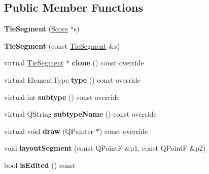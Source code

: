 \subsection*{Public Member Functions}
\begin{DoxyCompactItemize}
\item 
\mbox{\label{class_ms_1_1_tie_segment_aa46fdd0fd3d806deba6262d6aca0415e}} 
{\bfseries Tie\+Segment} (\hyperlink{class_ms_1_1_score}{Score} $\ast$s)
\item 
\mbox{\label{class_ms_1_1_tie_segment_aa6b294530c7d91eb5ee21a8945b9dd31}} 
{\bfseries Tie\+Segment} (const \hyperlink{class_ms_1_1_tie_segment}{Tie\+Segment} \&s)
\item 
\mbox{\label{class_ms_1_1_tie_segment_a354b838cff3d0ba557bbdc4f90f32cbb}} 
virtual \hyperlink{class_ms_1_1_tie_segment}{Tie\+Segment} $\ast$ {\bfseries clone} () const override
\item 
\mbox{\label{class_ms_1_1_tie_segment_afa64e2ed5eb84484364e7a494a3a270b}} 
virtual Element\+Type {\bfseries type} () const override
\item 
\mbox{\label{class_ms_1_1_tie_segment_a9b754345d05735b95925ef07678c1542}} 
virtual int {\bfseries subtype} () const override
\item 
\mbox{\label{class_ms_1_1_tie_segment_a153b2e551fa66c0d4170d5683734a21d}} 
virtual Q\+String {\bfseries subtype\+Name} () const override
\item 
\mbox{\label{class_ms_1_1_tie_segment_a6dc859c8abbcd10fc5af34d833b8025e}} 
virtual void {\bfseries draw} (Q\+Painter $\ast$) const override
\item 
\mbox{\label{class_ms_1_1_tie_segment_a1bc7ca4207f2f3b2e84c8b7b9ff80f9e}} 
void {\bfseries layout\+Segment} (const Q\+PointF \&p1, const Q\+PointF \&p2)
\item 
\mbox{\label{class_ms_1_1_tie_segment_a8609ccc49e8e4cca96c6f6af015a9109}} 
bool {\bfseries is\+Edited} () const

\end{DoxyCompactItemize}
